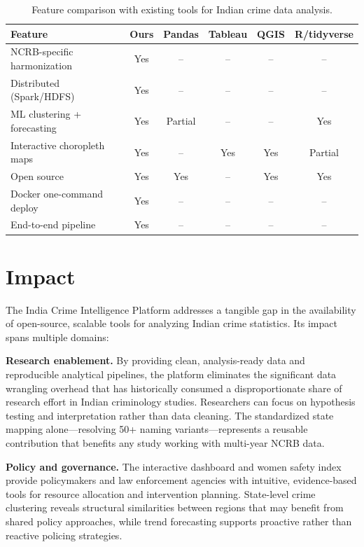 \documentclass[a4paper,12pt]{article}
\begin{document}
\begin{table}[h!]
\small
\centering
\renewcommand{\arraystretch}{1.25}
\begin{tabularx}{\textwidth}{|>{\raggedright\arraybackslash}X|c|c|c|c|c|}
\hline
\textbf{Feature} & \textbf{Ours} & \textbf{Pandas} & \textbf{Tableau} & \textbf{QGIS} & \textbf{R/tidyverse} \\
\hline
NCRB-specific harmonization & Yes & -- & -- & -- & -- \\
\hline
Distributed (Spark/HDFS) & Yes & -- & -- & -- & -- \\
\hline
ML clustering + forecasting & Yes & Partial & -- & -- & Yes \\
\hline
Interactive choropleth maps & Yes & -- & Yes & Yes & Partial \\
\hline
Open source & Yes & Yes & -- & Yes & Yes \\
\hline
Docker one-command deploy & Yes & -- & -- & -- & -- \\
\hline
End-to-end pipeline & Yes & -- & -- & -- & -- \\
\hline
\end{tabularx}
\caption{Feature comparison with existing tools for Indian crime data analysis.}
\end{table}

\section{Impact}

The India Crime Intelligence Platform addresses a tangible gap in the availability of open-source, scalable tools for analyzing Indian crime statistics. Its impact spans multiple domains:

\textbf{Research enablement.} By providing clean, analysis-ready data and reproducible analytical pipelines, the platform eliminates the significant data wrangling overhead that has historically consumed a disproportionate share of research effort in Indian criminology studies. Researchers can focus on hypothesis testing and interpretation rather than data cleaning. The standardized state mapping alone---resolving 50+ naming variants---represents a reusable contribution that benefits any study working with multi-year NCRB data.

\textbf{Policy and governance.} The interactive dashboard and women safety index provide policymakers and law enforcement agencies with intuitive, evidence-based tools for resource allocation and intervention planning. State-level crime clustering reveals structural similarities between regions that may benefit from shared policy approaches, while trend forecasting supports proactive rather than reactive policing strategies.
\end{document}
